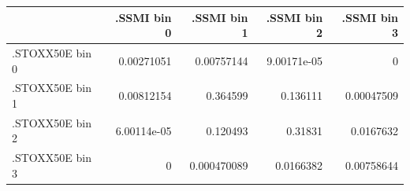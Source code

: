 \begin{tabular}{lrrrr}
\toprule
 & .SSMI bin 0 & .SSMI bin 1 & .SSMI bin 2 & .SSMI bin 3 \\
\midrule
.STOXX50E bin 0 & 0.00271051 & 0.00757144 & 9.00171e-05 & 0 \\
.STOXX50E bin 1 & 0.00812154 & 0.364599 & 0.136111 & 0.00047509 \\
.STOXX50E bin 2 & 6.00114e-05 & 0.120493 & 0.31831 & 0.0167632 \\
.STOXX50E bin 3 & 0 & 0.000470089 & 0.0166382 & 0.00758644 \\
\bottomrule
\end{tabular}
